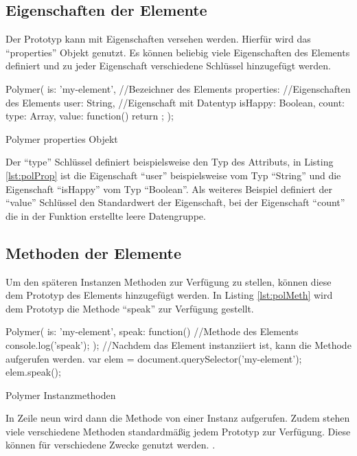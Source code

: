 \documentclass[12pt, paper=a4, bibtotoc, toc=listof, headsepline=true]{scrreprt}
\begin{document}
\subsection{Eigenschaften der Elemente}
Der Prototyp kann mit Eigenschaften versehen werden. Hierfür wird das \enquote{properties} Objekt genutzt. Es können beliebig viele Eigenschaften des Elements definiert und zu jeder Eigenschaft verschiedene Schlüssel hinzugefügt werden.
\begin{listing}
	\begin{JavaScriptcode*}{}
Polymer({
   is: 'my-element', //Bezeichner des Elements
   properties: {  //Eigenschaften des Elements
      user: String, //Eigenschaft mit Datentyp
      isHappy: Boolean,
      count: {
         type: Array,
         value: function() { return {}; }
      }
   }
});
	\end{JavaScriptcode*}
	\caption{Polymer properties Objekt}
	\label{lst:polProp}
\end{listing}
Der \enquote{type} Schlüssel definiert beispielsweise den Typ des Attributs, in Listing \ref{lst:polProp} ist die Eigenschaft \enquote{user} beispielsweise vom Typ \enquote{String} und die Eigenschaft \enquote{isHappy} vom Typ \enquote{Boolean}. Als weiteres Beispiel definiert der \enquote{value} Schlüssel den Standardwert der Eigenschaft, bei der Eigenschaft \enquote{count} die in der Funktion erstellte leere Datengruppe\cite{polyProp}.
\subsection{Methoden der Elemente}
Um den späteren Instanzen Methoden zur Verfügung zu stellen, können diese dem Prototyp des Elements hinzugefügt werden. In Listing \ref{lst:polMeth} wird dem Prototyp die Methode \enquote{speak} zur Verfügung gestellt.
\begin{listing}
	\begin{JavaScriptcode*}{}
Polymer({
   is: 'my-element',
   speak: function(){  //Methode des Elements
   console.log('speak');
   }
});
//Nachdem das Element instanziiert ist, kann die Methode aufgerufen werden.
var elem = document.querySelector('my-element');
elem.speak();
	\end{JavaScriptcode*}
	\caption{Polymer Instanzmethoden}
	\label{lst:polMeth}
\end{listing} In Zeile neun wird dann die Methode von einer Instanz aufgerufen. Zudem stehen viele verschiedene Methoden standardmäßig jedem Prototyp zur Verfügung. Diese können für verschiedene Zwecke genutzt werden. \cite{polyInstMeth}.
\end{document}
